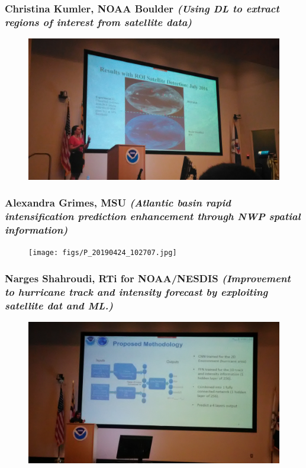 \documentclass{beamer}
\begin{document}
\begin{frame}
\frametitle{Christina Kumler, NOAA Boulder \textit{(Using DL to extract regions of interest from satellite data)}}
\begin{figure}
	\includegraphics[width=.9\linewidth]{figs/P_20190424_092340.jpg}
\end{figure}
\end{frame}

\begin{frame}
\frametitle{Alexandra Grimes, MSU \textit{(Atlantic basin rapid intensification prediction enhancement through NWP spatial information)}}
\begin{figure}
	\texttt{[image: figs/P\_20190424\_102707.jpg]}
\end{figure}
\end{frame}

\begin{frame}
\frametitle{Narges Shahroudi, RTi for NOAA/NESDIS \textit{(Improvement to hurricane track and intensity forecast by exploiting satellite dat and ML.)}}
\begin{figure}
	\includegraphics[width=.9\linewidth]{figs/P_20190424_143519.jpg}
\end{figure}
\end{frame}
\end{document}
